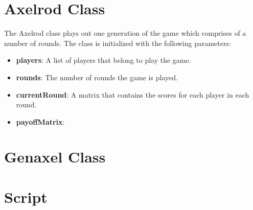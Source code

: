\section{Axelrod Class}
The Axelrod class plays out one generation of the game which comprises of a number of rounds. The class is initialized with the following parameters:
\begin{itemize}
    \item \textbf{players}: A list of players that belong to  play the game.
    \item \textbf{rounds}: The number of rounds the game is played.
    \item \textbf{currentRound}: A matrix that contains the scores for each player in each round.
    \item \textbf{payoffMatrix}: 
  
\end{itemize}

\section{Genaxel Class}

\section{Script}